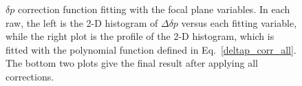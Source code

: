 \begin{figure}[!ht]
  \begin{center}
    \hfill
    \hfill
    
    \caption[$\delta p$ correction function fitting]{\footnotesize{$\delta p$ correction function fitting with the focal plane variables. In each raw, the left is the 2-D histogram of $\Delta\delta p$ versus each fitting variable, while the right plot is the profile of the 2-D histogram, which is fitted with the polynomial function defined in Eq.~\eqref{deltap_corr_all}. The bottom two plots give the final result after applying all corrections.}}
    \label{deltap_fitting}
  \end{center}
\end{figure}

